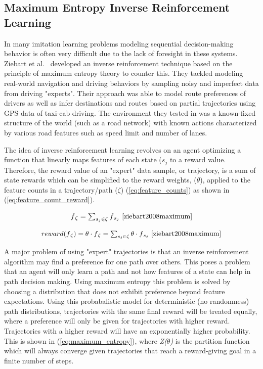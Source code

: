 \documentclass[12pt,american]{report}
\begin{document}
\subsection{Maximum Entropy Inverse Reinforcement Learning}
\label{sec:maxentirl}
In many imitation learning problems modeling sequential decision-making behavior is often very difficult due to the lack of foresight in these systems. Ziebart et al.~\cite{ziebart2008maximum} developed an inverse reinforcement technique based on the principle of maximum entropy theory to counter this.  They tackled modeling real-world navigation and driving behaviors by sampling noisy and imperfect data from driving "experts".  Their approach was able to model route preferences of drivers as well as infer destinations and routes based on partial trajectories using GPS data of taxi-cab driving.  The environment they tested in was a known-fixed structure of the world (such as a road network) with known actions characterized by various road features such as speed limit and number of lanes.

The idea of inverse reinforcement learning revolves on an agent optimizing a function that linearly maps features of each state (\textit{$s_j$} to a reward value. Therefore, the reward value of an "expert" data sample, or trajectory, is a sum of state rewards which can be simplified to the reward weights, (\textit{$\theta$}), applied to the feature counts in a trajectory/path ($\zeta$) (\ref{eq:feature_counts}) as shown in (\ref{eq:feature_count_reward}).

\begin{equation}
            \label{eq:feature_counts}
            \resizebox{0.20\textwidth}{!}{$f\textsubscript{$\zeta$}= \sum_{s_j\in\zeta}^{}f\textsubscript{$s_j$}$}~\cite{ziebart2008maximum}%
        \end{equation}

\begin{equation}
            \label{eq:feature_count_reward}
            \resizebox{0.44\textwidth}{!}{$reward(f\textsubscript{$\zeta$})= \theta \cdot f\textsubscript{$\zeta$} = \sum_{s_j\in\zeta}^{}\theta \cdot f\textsubscript{$s_j$}$}~\cite{ziebart2008maximum}
        \end{equation}

A major problem of using "expert" trajectories is that an inverse reinforcement algorithm may find a preference for one path over others.  This poses a problem that an agent will only learn a path and not how features of a state can help in path decision making.  Using maximum entropy this problem is solved by choosing a distribution that does not exhibit preference beyond feature expectations.  Using this probabalistic model for deterministic (no randomness) path distributions, trajectories with the same final reward will be treated equally, where a preference will only be given for trajectories with higher reward.  Trajectories with a higher reward will have an exponentially higher probability. This is shown in (\ref{eq:maximum_entropy}), where \textit{Z($\theta$)} is the partition function which will always converge given trajectories that reach a reward-giving goal in a finite number of steps.
\end{document}
